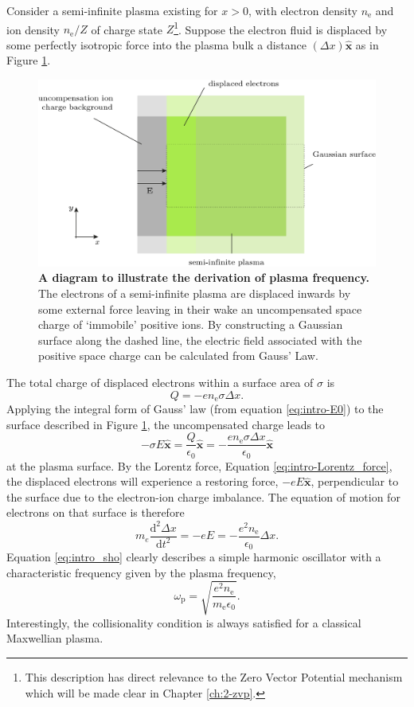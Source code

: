 Consider a semi-infinite plasma existing for $x>0$, with electron density $n_\mathrm{e}$ and ion density $n_\mathrm{e}/Z$ of charge state $Z$\footnote{This description has direct relevance to the Zero Vector Potential mechanism which will be made clear in Chapter \ref{ch:2-zvp}.}. Suppose the electron fluid is displaced by some perfectly isotropic force into the plasma bulk a distance $(\Delta x) \hat{\mathbf{x}}$ as in Figure \ref{fig:introplasmafrequency}. 
\begin{figure}
	\centering
	\includegraphics[width=0.7\linewidth]{figures/intro/intro_plasma_frequency}
	\caption[A diagram to illustrate the derivation of plasma frequency.]{\textbf{A diagram to illustrate the derivation of plasma frequency.} The electrons of a semi-infinite plasma are displaced inwards by some external force leaving in their wake an uncompensated space charge of `immobile' positive ions. By constructing a Gaussian surface along the dashed line, the electric field associated with the positive space charge can be calculated from Gauss' Law.}
	\label{fig:introplasmafrequency}
\end{figure}
The total charge of displaced electrons within a surface area of $\sigma$ is 
\begin{equation}\label{eq:intro_Q}
	Q = -en_\mathrm{e}\sigma\Delta x.
\end{equation}
Applying the integral form of Gauss' law (from equation \ref{eq:intro-E0}) to the surface described in Figure \ref{fig:introplasmafrequency}, the uncompensated charge leads to 
\begin{equation}\label{eq:intro_E}
	-\sigma E\hat{\mathbf{x}}= \frac{Q}{\epsilon_0}\hat{\mathbf{x}} = -\frac{en_\mathrm{e}\sigma\Delta x}{\epsilon_0}\hat{\mathbf{x}}
\end{equation}
at the plasma surface. By the Lorentz force, Equation \ref{eq:intro-Lorentz_force}, the displaced electrons will experience a restoring force, $-eE\hat{\mathbf{x}}$, perpendicular to the surface due to the electron-ion charge imbalance. The equation of motion for electrons on that surface is therefore
\begin{equation}\label{eq:intro_sho}
	m_e\frac{\mathrm{d}^2\Delta x}{\mathrm{d}t^2} = -eE = -\frac{e^2n_\mathrm{e}}{\epsilon_0}\Delta x.
\end{equation}
Equation \ref{eq:intro_sho} clearly describes a simple harmonic oscillator with a characteristic frequency given by the plasma frequency,
\begin{equation}
	\omega_\mathrm{p} = \sqrt{\frac{e^2n_\mathrm{e}}{m_\mathrm{e} \epsilon_0}}.
\end{equation}
Interestingly, the collisionality condition is always satisfied for a classical Maxwellian plasma.

